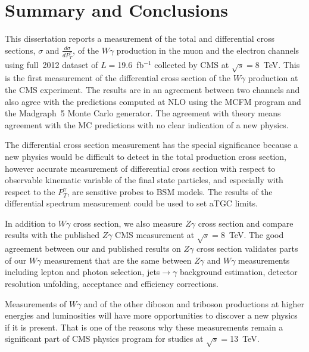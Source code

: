 \chapter{Summary and Conclusions}
\label{sec:Conclusions}

This dissertation reports a measurement of the total and differential cross sections, $\sigma$ and $\frac{d\sigma}{dP_T^{\gamma}}$, of the $W\gamma$ production in the muon and the electron channels using full~2012 dataset of $L=$19.6~fb$^{-1}$ collected by CMS at $\sqrt{s}=$8~TeV. This is the first measurement of the differential cross section of the $W\gamma$ production at the CMS experiment. The results are in an agreement between two channels and also agree with the predictions computed at NLO using the MCFM program and the Madgraph~5 Monte Carlo generator. The agreement with theory means agreement with the MC predictions with no clear indication of a new physics.

The differential cross section measurement has the special significance because a new physics would be difficult to detect in the total production cross section, however accurate measurement of differential cross section with respect to observable kinematic variable of the final state particles, and especially with respect to the $P_T^{\gamma}$, are sensitive probes to BSM models. The results of the differential spectrum measurement could be used to set aTGC limits.

In addition to $W\gamma$ cross section, we also measure $Z\gamma$ cross section and compare results with the published $Z\gamma$ CMS measurement at $\sqrt{s}=$8~TeV. The good agreement between our and published results on $Z\gamma$ cross section validates parts of our $W\gamma$ measurement that are the same between $Z\gamma$ and $W\gamma$ measurements including lepton and photon selection, jets$\rightarrow\gamma$ background estimation, detector resolution unfolding, acceptance and efficiency corrections.

Measurements of $W\gamma$ and of the other diboson and triboson productions at higher energies and luminosities will have more opportunities to discover a new physics if it is present. That is one of the reasons why these measurements remain a significant part of CMS physics program for studies at $\sqrt{s}=$13~TeV.

